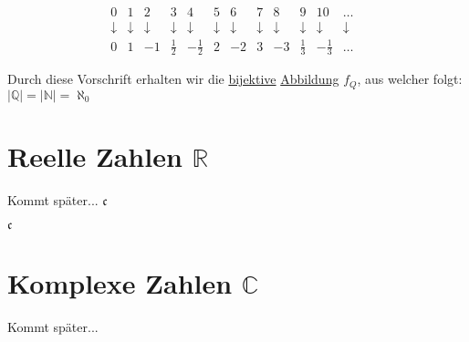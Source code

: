 \documentclass[../../main.tex]{subfiles}
\begin{document}
\begin{itemize}
			$$			
			\begin{matrix}
			0 & 1 & 2           & 3 & 4           & 5 & 6 & 7 & 8 & 9 & 10 & \dots \\
			\downarrow & \downarrow & \downarrow & \downarrow & \downarrow & \downarrow & \downarrow & \downarrow & \downarrow & \downarrow & \downarrow & \downarrow & \\
			0 & 1 & -1 & \frac{1}{2} & -\frac{1}{2} & 2 & -2 & 3 & -3 & \frac{1}{3} & - \frac{1}{3} & \dots
			\end{matrix}
			$$
			
			Durch diese Vorschrift erhalten wir die \hyperref[def:Bijektiv]{bijektive} \hyperref[def:Abbildung]{Abbildung} $f_Q$, aus welcher folgt: $|\mathbb{Q}| = |\mathbb{N}| = \aleph_0$
		
		\end{itemize}
		
		\section{Reelle Zahlen $\mathbb{R}$}
		Kommt später...
		$\mathfrak{c}$
		
		\begin{definition}
			\label{def:ReelleZahlen}
		\end{definition}
	
		\begin{definition}
			\label{def:überabzählbarUnendlich}
			$\mathfrak{c}$
		\end{definition}
		
		
		
		\section{Komplexe Zahlen $\mathbb{C}$}
		Kommt später...
	
\end{document}
